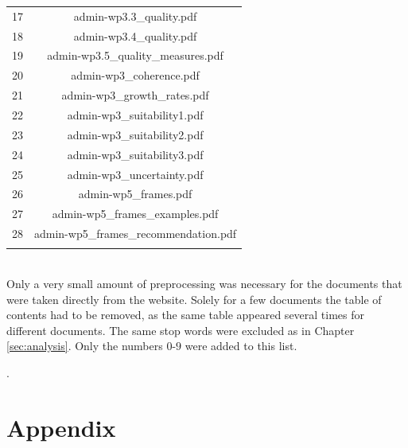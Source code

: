 \documentclass[11pt,a4paper]{article}
\begin{document}
\begin{table}[!htbp]
\begin{tabular}{@{\extracolsep{5pt}} cc}
		17 & admin-wp3.3\_quality.pdf \\ 
		18 & admin-wp3.4\_quality.pdf \\ 
		19 & admin-wp3.5\_quality\_measures.pdf \\ 
		20 & admin-wp3\_coherence.pdf \\ 
		21 & admin-wp3\_growth\_rates.pdf \\ 
		22 & admin-wp3\_suitability1.pdf \\ 
		23 & admin-wp3\_suitability2.pdf \\ 
		24 & admin-wp3\_suitability3.pdf \\ 
		25 & admin-wp3\_uncertainty.pdf \\ 
		26 & admin-wp5\_frames.pdf \\ 
		27 & admin-wp5\_frames\_examples.pdf \\ 
		28 & admin-wp5\_frames\_recommendation.pdf \\ 
		\hline \\[-1.8ex] 
	\end{tabular} 
\end{table} 
\ \\
Only a very small amount of preprocessing was necessary for the documents that were taken directly from the website. Solely for a few documents the table of contents had to be removed, as the same table appeared several times for different documents. The same stop words were excluded as in Chapter \ref{sec:analysis}. Only the numbers $0$-$9$ were added to this list.




\newpage 
.
\newpage
\appendix
\section{Appendix}
	
  
  


\listoffigures
\listoftables

	
	
\end{document}
